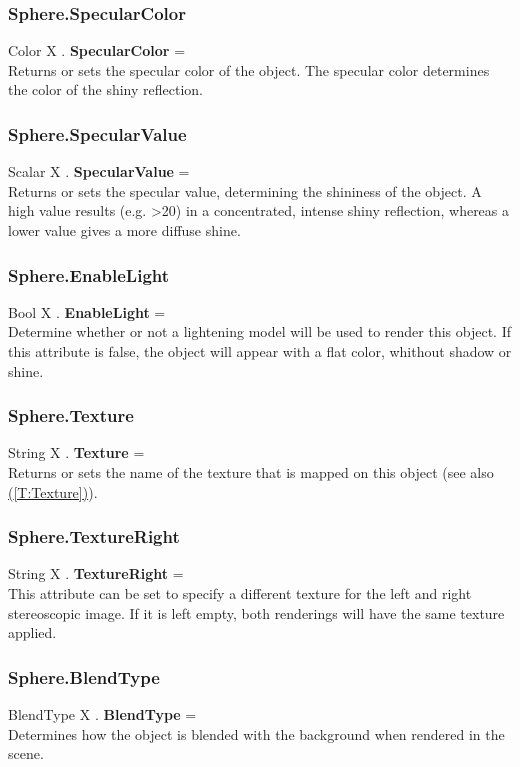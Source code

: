 \documentclass[10pt]{book}
\newcommand{\linkitem}[1]{\hyperref[#1]{\nameref{#1} (\ref{#1})}}
\begin{document}
\subsubsection{Sphere.SpecularColor \label{F:Sphere:SpecularColor}}
Color X . \textbf{SpecularColor} = \\
Returns or sets the specular color of the object. The specular color determines the color of the shiny reflection.

\subsubsection{Sphere.SpecularValue \label{F:Sphere:SpecularValue}}
Scalar X . \textbf{SpecularValue} = \\
Returns or sets the specular value, determining the shininess of the object. A high value results (e.g. >20) in a concentrated, intense shiny reflection, whereas a lower value gives a more diffuse shine.

\subsubsection{Sphere.EnableLight \label{F:Sphere:EnableLight}}
Bool X . \textbf{EnableLight} = \\
Determine whether or not a lightening model will be used to render this object. If this attribute is false, the object will appear with a flat color, whithout shadow or shine.

\subsubsection{Sphere.Texture \label{F:Sphere:Texture}}
String X . \textbf{Texture} = \\
Returns or sets the name of the texture that is mapped on this object (see also \linkitem{T:Texture}).

\subsubsection{Sphere.TextureRight \label{F:Sphere:TextureRight}}
String X . \textbf{TextureRight} = \\
This attribute can be set to specify a different texture for the left and right stereoscopic image. If it is left empty, both renderings will have the same texture applied.

\subsubsection{Sphere.BlendType \label{F:Sphere:BlendType}}
BlendType X . \textbf{BlendType} = \\
Determines how the object is blended with the background when rendered in the scene.
\end{document}
